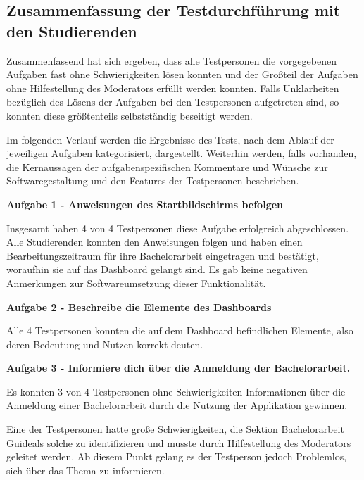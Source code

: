 \documentclass[bibliography=totoc,listof=totoc,BCOR=5mm,DIV=12,oneside]{scrbook}
\begin{document}
{\newpage
\subsection{Zusammenfassung der Testdurchführung mit den Studierenden}
\par Zusammenfassend hat sich ergeben, dass alle Testpersonen die vorgegebenen Aufgaben fast ohne Schwierigkeiten lösen konnten und der Großteil der Aufgaben ohne Hilfestellung des Moderators erfüllt werden konnten. Falls Unklarheiten bezüglich des Lösens der Aufgaben bei den Testpersonen aufgetreten sind, so konnten diese größtenteils selbstständig beseitigt werden.

\par \bigskip Im folgenden Verlauf werden die Ergebnisse des Tests, nach dem Ablauf der jeweiligen Aufgaben kategorisiert, dargestellt. Weiterhin werden, falls vorhanden, die Kernaussagen der aufgabenspezifischen Kommentare und Wünsche zur Softwaregestaltung und den Features der Testpersonen beschrieben.


\par \bigskip \textbf{Aufgabe 1 - Anweisungen des Startbildschirms befolgen}
\par Insgesamt haben 4 von 4 Testpersonen diese Aufgabe erfolgreich abgeschlossen. Alle Studierenden konnten den Anweisungen folgen und haben einen Bearbeitungszeitraum für ihre Bachelorarbeit eingetragen und bestätigt, woraufhin sie auf das Dashboard gelangt sind. Es gab keine negativen Anmerkungen zur Softwareumsetzung dieser Funktionalität.

\par \bigskip \textbf{Aufgabe 2 - Beschreibe die Elemente des Dashboards}
\par Alle 4 Testpersonen konnten die auf dem Dashboard befindlichen Elemente, also deren Bedeutung und Nutzen korrekt deuten.

\par \bigskip \textbf{Aufgabe 3 - Informiere dich über die Anmeldung der Bachelorarbeit.}
\par Es konnten 3 von 4 Testpersonen ohne Schwierigkeiten  Informationen über die Anmeldung einer Bachelorarbeit durch die Nutzung der Applikation gewinnen. 
\par \medskip Eine der Testpersonen hatte große Schwierigkeiten, die Sektion \grqq Bachelorarbeit Guide\grqq als solche zu identifizieren und musste durch Hilfestellung des Moderators geleitet werden. Ab diesem Punkt gelang es der Testperson jedoch Problemlos, sich über das Thema zu informieren.

}
\end{document}
